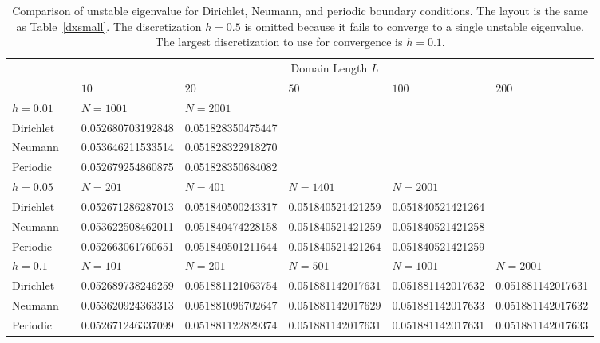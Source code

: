 \begin{landscape}
\begin{table}[htb!] 
\centering
{}
\begin{tabular}{@{}lllllll@{}}\toprule
&& \multicolumn{5}{c}{Domain Length $L$}  \\
\cmidrule{3-7}
&& $10$ & $20$ & $50$ & $100$ & $200$ \\ \midrule
$h = 0.01$ && $N= 1001$ & $N = 2001$ & & & \\ %
Dirichlet && 0.052680703192848 & 0.051828350475447 & & & \\ 
Neumann && 0.053646211533514 &  0.051828322918270 & & & \\ 
Periodic && 0.052679254860875 & 0.051828350684082 & & & \\ \midrule
$h = 0.05$ && $N= 201$ & $N = 401$ & $N = 1401$ & $N = 2001$ & \\ %
Dirichlet && 0.052671286287013 & 0.051840500243317 & 0.051840521421259 & 0.051840521421264 & \\ 
Neumann && 0.053622508462011 & 0.051840474228158 & 0.051840521421259 & 0.051840521421258 &\\ 
Periodic && 0.052663061760651 & 0.051840501211644 & 0.051840521421264 & 0.051840521421259 & \\ \midrule
$h = 0.1$ && $N= 101$ & $N = 201$ & $N = 501$ & $N = 1001$ & $N = 2001$ \\
Dirichlet && 0.052689738246259 & 0.051881121063754 & 0.051881142017631 & 0.051881142017632 & 0.051881142017631 \\ 
Neumann && 0.053620924363313 &  0.051881096702647 &  0.051881142017629 & 0.051881142017633 & 0.051881142017632 \\ 
Periodic && 0.052671246337099 & 0.051881122829374 & 0.051881142017631 & 0.051881142017631 & 0.051881142017633\\  \midrule
\bottomrule
\end{tabular}
\caption[Comparison of Unstable Eigenvalue for Dirichlet, Neumann, and Periodic Boundary Conditions]{Comparison of unstable eigenvalue for Dirichlet, Neumann, and periodic boundary conditions.  The layout is the same as Table~\ref{dxsmall}.  The discretization $h=0.5$ is omitted because it fails to converge to a single unstable eigenvalue.  The largest discretization to use for convergence is $h=0.1$.}
\label{unstableeigTable}
\end{table}
\end{landscape}

